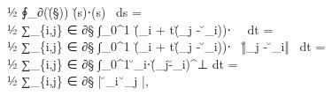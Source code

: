 ½ ∮_{∂(\u(\S))} \u(s)⋅\n(s) \ ds = \\
  ½ ∑\limits_{\{i,j\} ∈ ∂\S} ∫_0^1 
     (\u_i + t(\u_j - \u_i))⋅ \
    \  dt = \\
  ½ ∑\limits_{\{i,j\} ∈ ∂\S} ∫_0^1 
     (\u_i + t(\u_j - \u_i))⋅ \
    ‖\u_j - \u_i‖ \  dt = \\
  ½ ∑\limits_{\{i,j\} ∈ ∂\S} ∫_0^1  \u_i⋅(\u_j-\u_i)^⊥  dt = \\
  ½ ∑\limits_{\{i,j\} ∈ ∂\S} | \u_i\  \u_j |,
